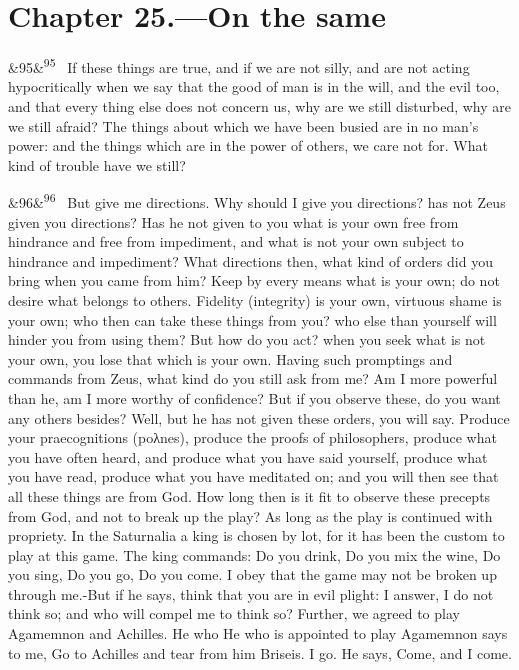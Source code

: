 \documentclass[12pt]{article}
\newcommand{\para}[1][]{\par\noindent\ifx&#1&\else\textsuperscript{\footnotesize #1}~\fi}
\begin{document}
\section*{Chapter 25.---On the same}

\para[95] If these things are true, and if we are not silly, and are not acting hypocritically when we say that the good of man is in the will, and the evil too, and that every thing else does not concern us, why are we still disturbed, why are we still afraid? The things about which we have been busied are in no man's power: and the things which are in the power of others, we care not for. What kind of trouble have we still?

\para[96] But give me directions. Why should I give you directions? has not Zeus given you directions? Has he not given to you what is your own free from hindrance and free from impediment, and what is not your own subject to hindrance and impediment? What directions then, what kind of orders did you bring when you came from him? Keep by every means what is your own; do not desire what belongs to others. Fidelity (integrity) is your own, virtuous shame is your own; who then can take these things from you? who else than yourself will hinder you from using them? But how do you act? when you seek what is not your own, you lose that which is your own. Having such promptings and commands from Zeus, what kind do you still ask from me? Am I more powerful than he, am I more worthy of confidence? But if you observe these, do you want any others besides? Well, but he has not given these orders, you will say. Produce your praecognitions (poλnes), produce the proofs of philosophers, produce what you have often heard, and produce what you have said yourself, produce what you have read, produce what you have meditated on; and you will then see that all these things are from God. How long then is it fit to observe these precepts from God, and not to break up the play? As long as the play is continued with propriety. In the Saturnalia a king is chosen by lot, for it has been the custom to play at this game. The king commands: Do you drink, Do you mix the wine, Do you sing, Do you go, Do you come. I obey that the game may not be broken up through me.-But if he says, think that you are in evil plight: I answer, I do not think so; and who will compel me to think so? Further, we agreed to play Agamemnon and Achilles. He who He who is appointed to play Agamemnon says to me, Go to Achilles and tear from him Briseis. I go. He says, Come, and I come.
\end{document}
